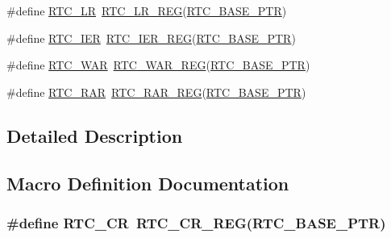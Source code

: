 \begin{DoxyCompactItemize}
\item 
\#define \hyperlink{group___r_t_c___register___accessor___macros_ga05e64891d0c59b705c0f96db04496416}{R\+T\+C\+\_\+\+LR}~\hyperlink{group___r_t_c___register___accessor___macros_gaecf5282b232b87123b993ec1ec9bd2a5}{R\+T\+C\+\_\+\+L\+R\+\_\+\+R\+EG}(\hyperlink{group___r_t_c___peripheral_ga6455e2b767b4b224b4f00b50e87a2441}{R\+T\+C\+\_\+\+B\+A\+S\+E\+\_\+\+P\+TR})
\item 
\#define \hyperlink{group___r_t_c___register___accessor___macros_gad06b6458073a45d15da59f51f95310ab}{R\+T\+C\+\_\+\+I\+ER}~\hyperlink{group___r_t_c___register___accessor___macros_ga967d371e055b3013c0f94830a357c19d}{R\+T\+C\+\_\+\+I\+E\+R\+\_\+\+R\+EG}(\hyperlink{group___r_t_c___peripheral_ga6455e2b767b4b224b4f00b50e87a2441}{R\+T\+C\+\_\+\+B\+A\+S\+E\+\_\+\+P\+TR})
\item 
\#define \hyperlink{group___r_t_c___register___accessor___macros_ga9df50a03050a0b3508563c63a95abbe6}{R\+T\+C\+\_\+\+W\+AR}~\hyperlink{group___r_t_c___register___accessor___macros_ga2c4d995d9d6c4857f7035982070319b8}{R\+T\+C\+\_\+\+W\+A\+R\+\_\+\+R\+EG}(\hyperlink{group___r_t_c___peripheral_ga6455e2b767b4b224b4f00b50e87a2441}{R\+T\+C\+\_\+\+B\+A\+S\+E\+\_\+\+P\+TR})
\item 
\#define \hyperlink{group___r_t_c___register___accessor___macros_ga88fb58901ea616d3040fb99e3f03722f}{R\+T\+C\+\_\+\+R\+AR}~\hyperlink{group___r_t_c___register___accessor___macros_ga56c0c73ad611109b3e53f53808092bd6}{R\+T\+C\+\_\+\+R\+A\+R\+\_\+\+R\+EG}(\hyperlink{group___r_t_c___peripheral_ga6455e2b767b4b224b4f00b50e87a2441}{R\+T\+C\+\_\+\+B\+A\+S\+E\+\_\+\+P\+TR})
\end{DoxyCompactItemize}


\subsection{Detailed Description}


\subsection{Macro Definition Documentation}
\subsubsection[{\texorpdfstring{R\+T\+C\+\_\+\+CR}{RTC_CR}}]{\setlength{\rightskip}{0pt plus 5cm}\#define R\+T\+C\+\_\+\+CR~{\bf R\+T\+C\+\_\+\+C\+R\+\_\+\+R\+EG}({\bf R\+T\+C\+\_\+\+B\+A\+S\+E\+\_\+\+P\+TR})}\hypertarget{group___r_t_c___register___accessor___macros_gab12a646e66898472d5b47da87e6a39f9}{}\label{group___r_t_c___register___accessor___macros_gab12a646e66898472d5b47da87e6a39f9}


